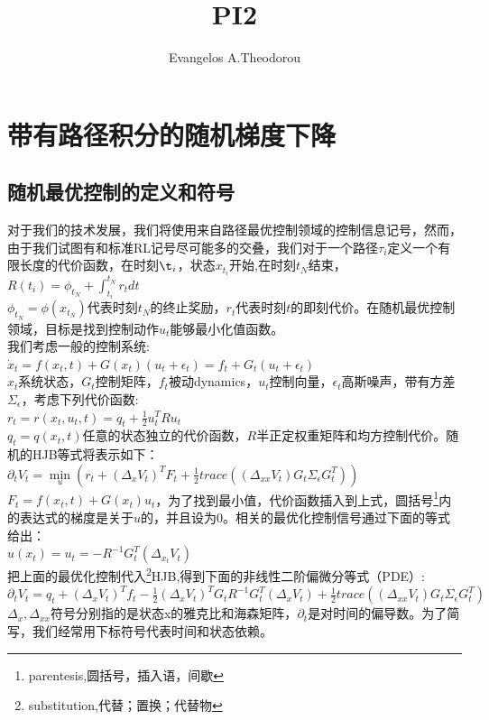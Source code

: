 \documentclass[2pt,a4paper]{article}
\title{PI2}
\begin{document}
\author{Evangelos A.Theodorou}
\section{带有路径积分的随机梯度下降}
\subsection{随机最优控制的定义和符号}
对于我们的技术发展，我们将使用来自路径最优控制领域的控制信息记号，然而，由于我们试图有和标准RL记号尽可能多的交叠，我们对于一个路径$\tau_i$定义一个有限长度的代价函数，在时刻$\t_i$，状态$x_{t_i}$开始,在时刻$t_N$结束，\\
$R(t_i)=\phi_{t_N}+\int _{t_i} ^{t_N} r_tdt$\\
$\phi_{t_N}=\phi(x_{t_N})$代表时刻$t_N$的终止奖励，$r_t$代表时刻$t$的即刻代价。在随机最优控制领域，目标是找到控制动作$u_t$能够最小化值函数。\\
我们考虑一般的控制系统:\\
$\dot{x}_t=f(x_t,t)+G(x_t)(u_t+\epsilon_t)=f_t+G_t(u_t+\epsilon_t)$\\
$x_t$系统状态，$G_t$控制矩阵，$f_t$被动dynamics，$u_t$控制向量，$\epsilon_t$高斯噪声，带有方差$\Sigma_{\epsilon}$，考虑下列代价函数:\\
$r_t=r(x_t,u_t,t)=q_t+\frac{1}{2}u_t^TRu_t$\\
$q_t=q(x_t,t)$任意的状态独立的代价函数，$R$半正定权重矩阵和均方控制代价。随机的HJB等式将表示如下：\\
$\partial_tV_t=\mathop{min}\limits_{u}(r_t+(\Delta_xV_t)^TF_t+\frac{1}{2}trace((\Delta_{xx}V_t)G_t\Sigma_{\epsilon}G_t^T))$\\
$F_t=f(x_t,t)+G(x_t)u_t$，为了找到最小值，代价函数插入到上式，圆括号\footnote{parentesis,圆括号，插入语，间歇}内的表达式的梯度是关于$u$的，并且设为0。相关的最优化控制信号通过下面的等式给出：\\
$u(x_t)=u_t=-R^{-1}G_t^T(\Delta_{x_t}V_t)$\\
把上面的最优化控制代入\footnote{substitution,代替；置换；代替物}HJB,得到下面的非线性二阶偏微分等式（PDE）:\\
$\partial_tV_t=q_t+(\Delta_xV_t)^Tf_t-\frac{1}{2}(\Delta_xV_t)^TG_tR^{-1}G_t^T(\Delta_xV_t)+\frac{1}{2}trace((\Delta_{xx}V_t)G_t\Sigma_{\epsilon}G_t^T)$\\
$\Delta_x,\Delta_{xx}$符号分别指的是状态x的雅克比和海森矩阵，$\partial_t$是对时间的偏导数。为了简写，我们经常用下标符号代表时间和状态依赖。
\end{document}
